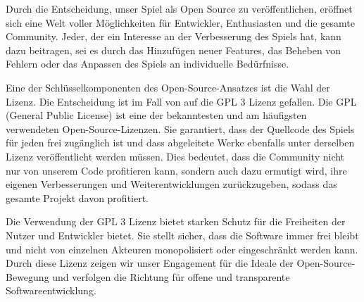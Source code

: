 Durch die Entscheidung, unser Spiel als Open Source zu veröffentlichen, eröffnet sich eine Welt voller Möglichkeiten für Entwickler, Enthusiasten und die gesamte Community. Jeder, der ein Interesse an der Verbesserung des Spiels hat, kann dazu beitragen, sei es durch das Hinzufügen neuer Features, das Beheben von Fehlern oder das Anpassen des Spiels an individuelle Bedürfnisse.

Eine der Schlüsselkomponenten des Open-Source-Ansatzes ist die Wahl der Lizenz. Die Entscheidung ist im Fall von \ff auf die GPL 3 Lizenz gefallen. Die GPL (General Public License) ist eine der bekanntesten und am häufigsten verwendeten Open-Source-Lizenzen. Sie garantiert, dass der Quellcode des Spiels für jeden frei zugänglich ist und dass abgeleitete Werke ebenfalls unter derselben Lizenz veröffentlicht werden müssen. Dies bedeutet, dass die Community nicht nur von unserem Code profitieren kann, sondern auch dazu ermutigt wird, ihre eigenen Verbesserungen und Weiterentwicklungen zurückzugeben, sodass das gesamte Projekt davon profitiert.

Die Verwendung der GPL 3 Lizenz bietet starken Schutz für die Freiheiten der Nutzer und Entwickler bietet. Sie stellt sicher, dass die Software immer frei bleibt und nicht von einzelnen Akteuren monopolisiert oder eingeschränkt werden kann. Durch diese Lizenz zeigen wir unser Engagement für die Ideale der Open-Source-Bewegung und verfolgen die Richtung für offene und transparente Softwareentwicklung.
%
\renewcommand{\kapitelautor}{}
